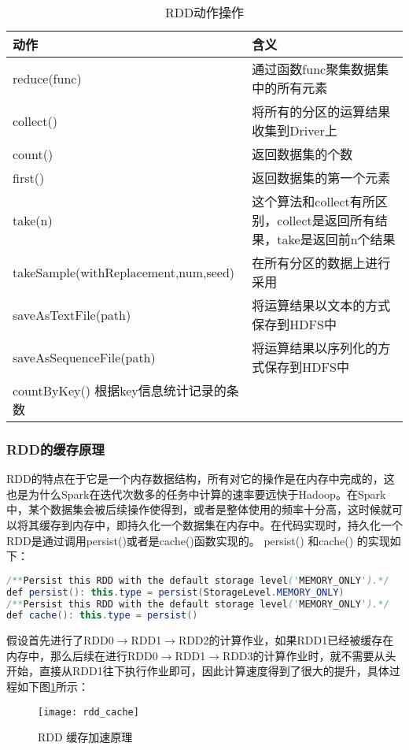 \begin{table}[h] %
\caption{RDD动作操作} %
\centering
\label{tab:action}
\begin{tabular}{p{6cm}|p{8cm}} %
\hline
\hline
动作  & 含义 \\ %
\hline %
reduce(func)  & 通过函数func聚集数据集中的所有元素\\
\hline
collect()  & 将所有的分区的运算结果收集到Driver上\\
\hline
count()  & 返回数据集的个数\\
\hline
first() & 返回数据集的第一个元素\\
\hline
take(n) & 这个算法和collect有所区别，collect是返回所有结果，take是返回前n个结果\\
\hline
takeSample(withReplacement,num,seed) & 在所有分区的数据上进行采用\\
\hline
saveAsTextFile(path) & 将运算结果以文本的方式保存到HDFS中\\
\hline
saveAsSequenceFile(path) & 将运算结果以序列化的方式保存到HDFS中\\
\hline
countByKey() 根据key信息统计记录的条数\\
\hline
\hline
\end{tabular}
\end{table}

\subsubsection{RDD的缓存原理}
RDD的特点在于它是一个内存数据结构，所有对它的操作是在内存中完成的，这也是为什么Spark在迭代次数多的任务中计算的速率要远快于Hadoop。在Spark中，某个数据集会被后续操作使得到，或者是整体使用的频率十分高，这时候就可以将其缓存到内存中，即持久化一个数据集在内存中。在代码实现时，持久化一个RDD是通过调用persist()或者是cache()函数实现的。 persist() 和cache() 的实现如下：
\begin{lstlisting}[language=Java,numbers=none,frame=none]
/**Persist this RDD with the default storage level('MEMORY_ONLY').*/
def persist(): this.type = persist(StorageLevel.MEMORY_ONLY)
/**Persist this RDD with the default storage level('MEMORY_ONLY').*/
def cache(): this.type = persist()
\end{lstlisting}

假设首先进行了RDD0$\rightarrow$RDD1$\rightarrow$RDD2的计算作业，如果RDD1已经被缓存在内存中，那么后续在进行RDD0$\rightarrow$RDD1$\rightarrow$RDD3的计算作业时，就不需要从头开始，直接从RDD1往下执行作业即可，因此计算速度得到了很大的提升，具体过程如下图\ref{fig:rdd_cache}所示：
\begin{figure}[htp]
\centering
\texttt{[image: rdd\_cache]}
\caption{RDD 缓存加速原理}
\label{fig:rdd_cache}
\end{figure}


